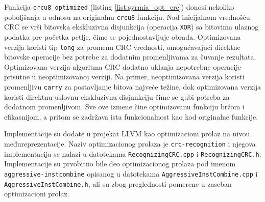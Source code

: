 \documentclass[12pt,oneside]{memoir}
\begin{document}
Funkcija \texttt{crcu8\_optimized} (listing \ref{list:syrmia_opt_crc}) donosi nekoliko poboljšanja u odnosu na originalnu \texttt{crcu8} funkciju. Nad inicijalnom vrednošću CRC se vrši bitovska ekskluzivna disjunkcija (operacija \texttt{XOR}) sa bitovima ulaznog podatka pre početka petlje, čime se pojednostavljuje obrada. Optimizovana verzija koristi tip \texttt{long} za promenu CRC vrednosti, omogućavajući direktne bitovske operacije bez potrebe za dodatnim promenljivama za čuvanje rezultata.
Optimizovana verzija algoritma CRC dodatno uklanja nepotrebne operacije prisutne u neoptimizovanoj verziji. Na primer, neoptimizovana verzija koristi promenljivu \texttt{carry} za postavljanje bitova najveće težine, dok optimizovana verzija koristi direktnu  uslovnu ekskluzivnu disjunkciju čime se gubi potreba za dodatnom promenljivom. Sve ove izmene čine optimizovanu funkciju bržom i efikasnijom, a pritom se zadržava ista funkcionalnost kao kod originalne funkcije.

Implementacije su dodate u projekat LLVM kao optimizacioni prolaz na nivou međureprezentacije. Naziv optimizacionog prolaza je \texttt{crc-recognition} i njegova implementacija se nalazi u datotekama \texttt{RecognizingCRC.cpp} i  \texttt{RecognizingCRC.h}. Implementacije su prvobitno bile deo optimizacionog prolaza pod imenom \texttt{aggressive-instcombine} opisanog u datotekama \texttt{AggressiveInstCombine.cpp} i \texttt{AggressiveInstCombine.h}, ali su zbog preglednosti pomerene u zaseban optimizacioni prolaz.
\end{document}
